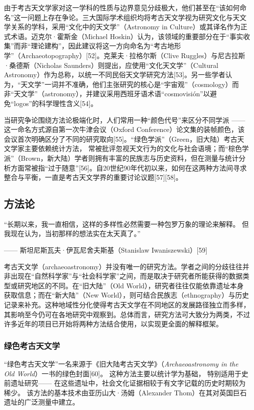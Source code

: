 由于考古天文学家对这一学科的性质与边界意见分歧极大，他们甚至在“该如何命名”这一问题上存在争论。三大国际学术组织均将考古天文学视为研究文化与天文学关系的学科，采用“文化中的天文学”（Astronomy in Culture）或其译名作为正式术语。迈克尔·霍斯金（Michael Hoskin）认为，该领域的重要部分在于“事实收集”而非“理论建构”，因此建议将这一方向命名为“考古地形学”（Archaeotopography）[52]。克莱夫·拉格尔斯（Clive Ruggles）与尼古拉斯·桑德斯（Nicholas Saunders）则提出，应使用“文化天文学”（Cultural Astronomy）作为总称，以统一不同民俗天文学研究方法[53]。另一些学者认为，“天文学”一词并不准确，他们主张研究的核心是“宇宙观”（cosmology）而非“天文学”（astronomy），并建议采用西班牙语术语“cosmovisión”以避免“logos”的科学理性含义[54]。

当研究争论围绕方法论极端化时，人们常用一种“颜色代号”来区分不同学派 —— 这一命名方式源自第一次牛津会议（Oxford Conference）论文集的装帧颜色，该会议首次明确区分了不同的研究取向[55]。“绿色学派”（Green，旧大陆）考古天文学家主要依赖统计方法，  
常被批评忽视天文行为的文化与社会语境；而“棕色学派”（Brown，新大陆）学者则拥有丰富的民族志与历史资料，但在测量与统计分析方面常被指“过于随意”[56]。自20世纪90年代初以来，如何在这两种方法间寻求整合与平衡，一直是考古天文学界的重要讨论议题[57][58]。
\subsection{方法论}
“长期以来，我一直相信，这样的多样性必然需要一种包罗万象的理论来解释。  
但我现在认为，当初那样的想法实在太天真了。”

—— 斯坦尼斯瓦夫·伊瓦尼舍夫斯基（Stanislaw Iwaniszewski）[59]

考古天文学（archaeoastronomy）并没有唯一的研究方法。学者之间的分歧往往并非出现在“自然科学家”与“社会科学家”之间，而是取决于研究者所能获得的数据类型或研究地区的不同。在“旧大陆”（Old World），研究者往往仅能依靠遗址本身获取信息；而在“新大陆”（New World），则可结合民族志（ethnography）与历史记录来补充。这种地域性分化使得考古天文学在不同地区的发展路径独立而多样，其影响至今仍可在各地研究中观察到。总体而言，研究方法可大致分为两类，不过许多近年的项目已开始将两种方法结合使用，以实现更全面的解释框架。

\subsubsection{绿色考古天文学}

“绿色考古天文学”一名来源于《旧大陆考古天文学》（\textit{Archaeoastronomy in the Old World}）一书的绿色封面[60]。  
这种方法主要以统计学为基础，  
特别适用于史前遗址研究——  
在这些遗址中，社会文化证据相较于有文字记载的历史时期较为稀少。  
该方法的基本技术由亚历山大·汤姆（Alexander Thom）在其对英国巨石遗址的广泛测量中建立。

